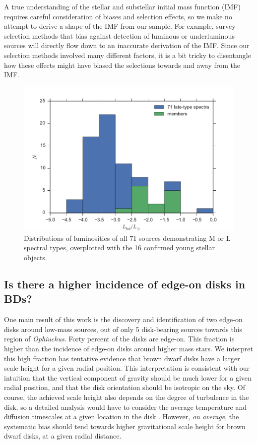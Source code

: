 A true understanding of the stellar and substellar initial mass function (IMF) requires careful consideration of biases and selection effects, so we make no attempt to derive a shape of the IMF from our sample.  For example, survey selection methods that bias against detection of luminous or underluminous sources will directly flow down to an inaccurate derivation of the IMF.  Since our selection methods involved many different factors, it is a bit tricky to disentangle how these effects might have biased the selections towards and away from the IMF.

\begin{figure}[ht!]
  \caption{ Distributions of luminosities of all 71 sources demonstrating M or L spectral types, overplotted with the 16 confirmed young stellar objects. \label{fig_luminosity_dist} }
\centering
\includegraphics[scale=0.6]{chIMACS/figures/luminosity_histogram}
\end{figure}


\subsection{Is there a higher incidence of edge-on disks in BDs?}
One main result of this work is the discovery and identification of two edge-on disks around low-mass sources, out of only 5 disk-bearing sources towards this region of \emph{Ophiuchus}.  Forty percent of the disks are edge-on.  This fraction is higher than the incidence of edge-on disks around higher mass stars.  We interpret this high fraction has tentative evidence that brown dwarf disks have a larger scale height for a given radial position.  This interpretation is consistent with our intuition that the vertical component of gravity should be much lower for a given radial position, and that the disk orientation should be isotropic on the sky.  Of course, the achieved scale height also depends on the degree of turbulence in the disk, so a detailed analysis would have to consider the average temperature and diffusion timescales at a given location in the disk \citep{2012A&A...539A...9M,2009MNRAS.394L.141E}.  However, \emph{on average}, the systematic bias should tend towards higher gravitational scale height for brown dwarf disks, at a given radial distance.

